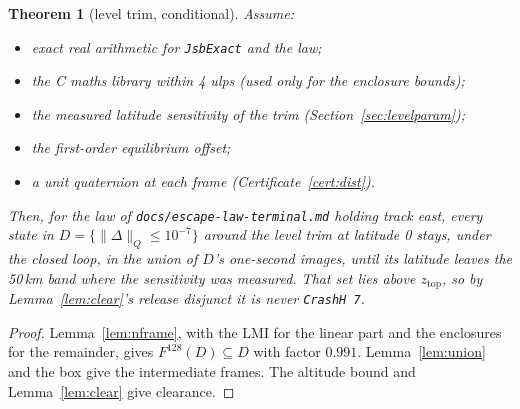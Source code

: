\documentclass[11pt]{article}
\newtheorem{theorem}{Theorem}
\newcommand{\zTop}{z_{\mathrm{top}}}
\begin{document}
\begin{theorem}[level trim, conditional]\label{thm:level}
Assume:
\begin{itemize}
\item exact real arithmetic for \texttt{JsbExact} and the law;
\item the C maths library within 4 ulps (used only for the enclosure bounds);
\item the measured latitude sensitivity of the trim (Section~\ref{sec:levelparam});
\item the first-order equilibrium offset;
\item a unit quaternion at each frame (Certificate~\ref{cert:dist}).
\end{itemize}
Then, for the law of \texttt{docs/escape-law-terminal.md} holding track east, every state in $D = \{\|\Delta\|_Q \le 10^{-7}\}$ around the level trim at latitude 0 stays, under the closed loop, in the union of $D$'s one-second images, until its latitude leaves the 50\,km band where the sensitivity was measured. That set lies above $\zTop$, so by Lemma~\ref{lem:clear}'s release disjunct it is never \texttt{CrashH 7}.
\end{theorem}
\begin{proof}
Lemma~\ref{lem:nframe}, with the LMI for the linear part and the enclosures for the remainder, gives $F^{128}(D) \subseteq D$ with factor $0.991$. Lemma~\ref{lem:union} and the box give the intermediate frames. The altitude bound and Lemma~\ref{lem:clear} give clearance.
\end{proof}
\end{document}
